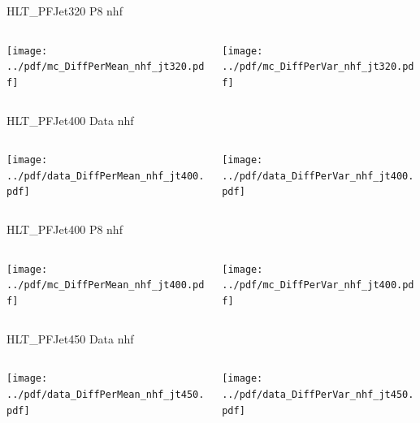 \documentclass[9pt]{beamer}
\begin{document}
\begin{frame}[t]{HLT\_PFJet320 P8 nhf}
\begin{columns}[T]
  \begin{column}{.5\textwidth}
  \texttt{[image: ../pdf/mc\_DiffPerMean\_nhf\_jt320.pdf]}
  \end{column}
  \begin{column}{.5\textwidth}
  \texttt{[image: ../pdf/mc\_DiffPerVar\_nhf\_jt320.pdf]}
  \end{column}
\end{columns}
\end{frame}

\begin{frame}[t]{HLT\_PFJet400 Data nhf}
\begin{columns}[T]
  \begin{column}{.5\textwidth}
  \texttt{[image: ../pdf/data\_DiffPerMean\_nhf\_jt400.pdf]}
  \end{column}
  \begin{column}{.5\textwidth}
  \texttt{[image: ../pdf/data\_DiffPerVar\_nhf\_jt400.pdf]}
  \end{column}
\end{columns}
\end{frame}

\begin{frame}[t]{HLT\_PFJet400 P8 nhf}
\begin{columns}[T]
  \begin{column}{.5\textwidth}
  \texttt{[image: ../pdf/mc\_DiffPerMean\_nhf\_jt400.pdf]}
  \end{column}
  \begin{column}{.5\textwidth}
  \texttt{[image: ../pdf/mc\_DiffPerVar\_nhf\_jt400.pdf]}
  \end{column}
\end{columns}
\end{frame}

\begin{frame}[t]{HLT\_PFJet450 Data nhf}
\begin{columns}[T]
  \begin{column}{.5\textwidth}
  \texttt{[image: ../pdf/data\_DiffPerMean\_nhf\_jt450.pdf]}
  \end{column}
  \begin{column}{.5\textwidth}
  \texttt{[image: ../pdf/data\_DiffPerVar\_nhf\_jt450.pdf]}
  \end{column}
\end{columns}
\end{frame}
\end{document}
